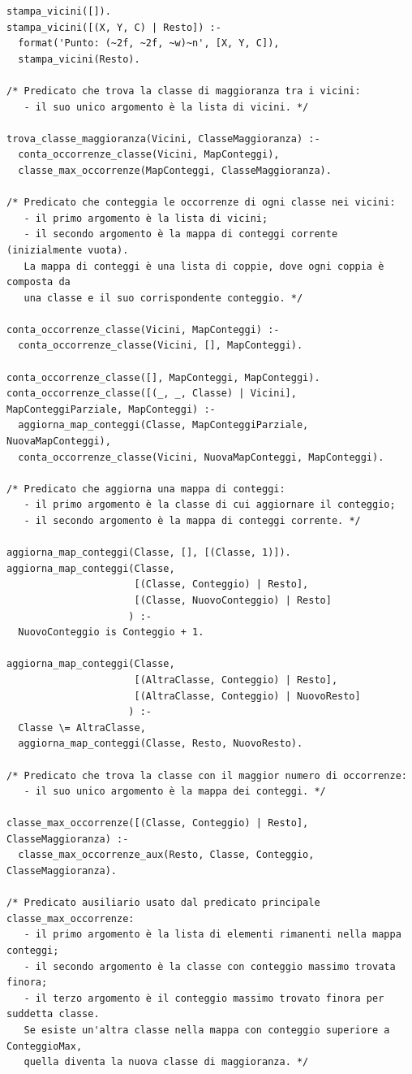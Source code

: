 \documentclass[11pt]{article}
\theoremstyle{definition}
\begin{document}
\begin{verbatim}
stampa_vicini([]).
stampa_vicini([(X, Y, C) | Resto]) :-
  format('Punto: (~2f, ~2f, ~w)~n', [X, Y, C]),
  stampa_vicini(Resto).
  
/* Predicato che trova la classe di maggioranza tra i vicini:
   - il suo unico argomento è la lista di vicini. */

trova_classe_maggioranza(Vicini, ClasseMaggioranza) :-
  conta_occorrenze_classe(Vicini, MapConteggi),
  classe_max_occorrenze(MapConteggi, ClasseMaggioranza).

/* Predicato che conteggia le occorrenze di ogni classe nei vicini: 
   - il primo argomento è la lista di vicini;
   - il secondo argomento è la mappa di conteggi corrente (inizialmente vuota).
   La mappa di conteggi è una lista di coppie, dove ogni coppia è composta da
   una classe e il suo corrispondente conteggio. */

conta_occorrenze_classe(Vicini, MapConteggi) :-
  conta_occorrenze_classe(Vicini, [], MapConteggi).
  
conta_occorrenze_classe([], MapConteggi, MapConteggi).
conta_occorrenze_classe([(_, _, Classe) | Vicini], MapConteggiParziale, MapConteggi) :-
  aggiorna_map_conteggi(Classe, MapConteggiParziale, NuovaMapConteggi),
  conta_occorrenze_classe(Vicini, NuovaMapConteggi, MapConteggi).

/* Predicato che aggiorna una mappa di conteggi:
   - il primo argomento è la classe di cui aggiornare il conteggio;
   - il secondo argomento è la mappa di conteggi corrente. */

aggiorna_map_conteggi(Classe, [], [(Classe, 1)]).
aggiorna_map_conteggi(Classe, 
                      [(Classe, Conteggio) | Resto], 
                      [(Classe, NuovoConteggio) | Resto]
                     ) :-
  NuovoConteggio is Conteggio + 1.

aggiorna_map_conteggi(Classe, 
                      [(AltraClasse, Conteggio) | Resto], 
                      [(AltraClasse, Conteggio) | NuovoResto]
                     ) :-
  Classe \= AltraClasse,
  aggiorna_map_conteggi(Classe, Resto, NuovoResto).

/* Predicato che trova la classe con il maggior numero di occorrenze:
   - il suo unico argomento è la mappa dei conteggi. */
   
classe_max_occorrenze([(Classe, Conteggio) | Resto], ClasseMaggioranza) :-
  classe_max_occorrenze_aux(Resto, Classe, Conteggio, ClasseMaggioranza).

/* Predicato ausiliario usato dal predicato principale classe_max_occorrenze:
   - il primo argomento è la lista di elementi rimanenti nella mappa conteggi;
   - il secondo argomento è la classe con conteggio massimo trovata finora;
   - il terzo argomento è il conteggio massimo trovato finora per suddetta classe. 
   Se esiste un'altra classe nella mappa con conteggio superiore a ConteggioMax, 
   quella diventa la nuova classe di maggioranza. */


\end{verbatim}
\end{document}
